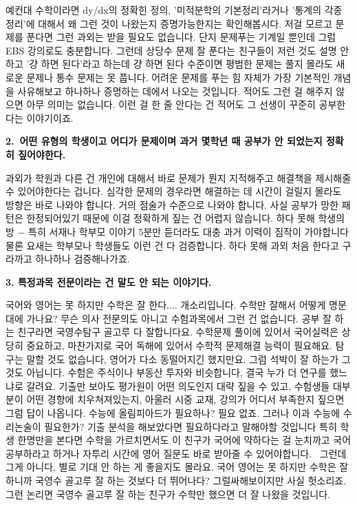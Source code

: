 예컨대 수학이라면
dy/dx의 정확힌 정의, '미적분학의 기본정리'라거나 '통계의 각종 정리'에 대해서 왜 그런 것이 나왔는지 증명가능한지는 확인해봅시다.
저걸 모르고 문제를 푼다면 그런 과외는 받을 필요도 없습니다. 단지 문제푸는 기계일 뿐인데 그럼 EBS 강의로도 충분합니다.
그런데 상당수 문제 잘 푼다는 친구들이 저런 것도 설명 안 하고 '걍 하면 된다'라고 하는데
걍 하면 된다 수준이면 평범한 문제는 풀지 몰라도 새로운 문제나 통수 문제는 못 풉니다.
어려운 문제를 푸는 힘 자체가 가장 기본적인 개념을 사유해보고 하나하나 증명하는 데에서 나오는 것입니다.
적어도 그런 걸 해주지 않으면 아무 의미는 없습니다. 이런 걸 한 줄 안다는 건 적어도 그 선생이 꾸준히 공부한다는 이야기이죠.
\vspace{5mm}

\item \textbf{2. 어떤 유형의 학생이고 어디가 문제이며 과거 몇학년 때 공부가 안 되었는지 정확히 짚어야한다.}
\vspace{5mm}

과외가 학원과 다른 건 개인에 대해서 바로 문제가 뭔지 지적해주고 해결책을 제시해줄 수 있어야한다는 겁니다.
심각한 문제의 경우라면 해결하는 데 시간이 걸릴지 몰라도 방향은 바로 나와야 합니다. 거의 점술가 수준으로 나와야 합니다.
사실 공부가 망한 패턴은 한정되어있기 때문에 이걸 정확하게 짚는 건 어렵지 않습니다.
하다 못해 학생의 방 $-$ 특히 서재나 학부모 이야기 5분만 듣더라도 대충 과거 이력이 짐작이 가야합니다
물론 요새는 학부모나 학생들도 이런 건 다 검증합니다. 하다 못해 과외 처음 한다고 구라까고 하나하나 검증해나가죠.
\vspace{5mm}

\item \textbf{3. 특정과목 전문이라는 건 말도 안 되는 이야기다.}
\vspace{5mm}

국어와 영어는 못 하지만 수학은 잘 한다.... 개소리입니다. 수학만 잘해서 어떻게 명문대에 가나요?
무슨 의사 전문의도 아니고 수험과목에서 그런 건 없습니다. 공부 잘 하는 친구라면 국영수탐구 골고루 다 잘합니다요.
수학문제 풀이에 있어서 국어실력은 상당히 중요하고, 마찬가지로 국어 독해에 있어서 수학적 문제해결 능력이 필요해요.
탐구는 말할 것도 없습니다, 영어가 다소 동떨어지긴 했지만요.
그럼 석박이 잘 하는가 그것도 아닙니다. 수험은 주식이나 부동산 투자와 비슷합니다, 결국 누가 더 연구를 했느냐로 갈려요.
기출만 보아도 평가원이 어떤 의도인지 대략 짚을 수 있고, 수험생들 대부분이 어떤 경향에 치우쳐져있는지,
아울러 시중 교재, 강의가 어디서 부족한지 짚으면 그럼 답이 나옵니다.
수능에 올림피아드가 필요하나? 필요 없죠. 그러나 이과 수능에 수리논술이 필요한가?
기출 분석을 해보았다면 필요하다라고 말해야할 것입니다
특히 학생 한명만을 본다면 수학을 가르치면서도 이 친구가 국어에 약하다는 걸 눈치까고 국어 공부하라고 하거나
자투리 시간에 영어 질문도 바로 받아줄 수 있어야합니다.  그런데 그게 아니다, 별로 기대 안 하는 게 좋을지도 몰라요.
국어 영어는 못 하지만 수학은 잘 하니까 국영수 골고루 잘 하는 것보다 더 뛰어나다?
그럴싸해보이지만 사실 헛소리죠.  그런 논리면 국영수 골고루 잘 하는 친구가 수학만 했으면 더 잘 나왔을 것입니다.
\vspace{5mm}

